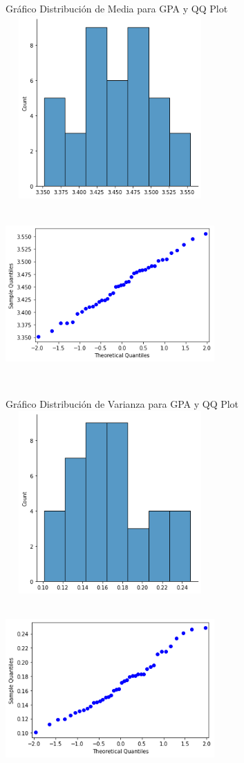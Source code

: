 \documentclass[12pt]{article}
\begin{document}
Gráfico Distribución de Media para GPA y QQ Plot\\
\includegraphics[width=8cm, height=7cm]{gpa_histo1}
\includegraphics[width=8cm, height=7cm]{gpa_qq1}

\clearpage
Gráfico Distribución de Varianza para GPA y QQ Plot\\
\includegraphics[width=8cm, height=7cm]{gpa_histo2}
\includegraphics[width=8cm, height=7cm]{gpa_qq2}
\end{document}

